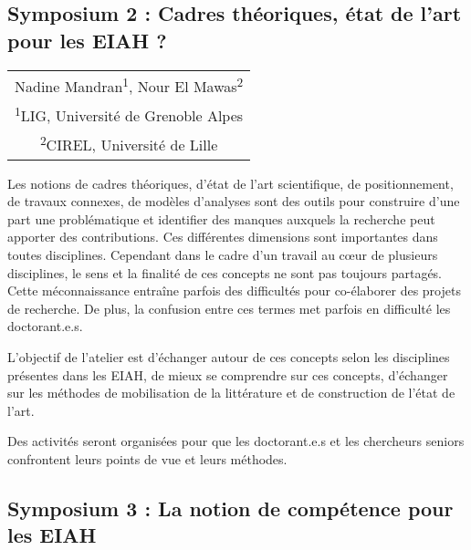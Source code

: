 \newpage

\vspace*{2em}
\begin{center}
	\subsection{Symposium 2 : Cadres théoriques, état de l’art pour les EIAH ?}
\end{center}

\vspace{1em}
\begin{center}
	\begin{tabular}{@{}c@{}}
		Nadine Mandran\textsuperscript{1}, Nour El Mawas\textsuperscript{2}\\
		\textsuperscript{1}LIG, Université de Grenoble Alpes \\
		\textsuperscript{2}CIREL, Université de Lille
	\end{tabular}
\end{center}

\vspace{2em}

Les notions de cadres théoriques, d’état de l’art scientifique, de positionnement, de travaux connexes, de modèles d’analyses sont des outils pour construire d’une part une problématique et identifier des manques auxquels la recherche peut apporter des contributions. Ces différentes dimensions sont importantes dans toutes disciplines. Cependant dans le cadre d’un travail au cœur de plusieurs disciplines, le sens et la finalité de ces concepts ne sont pas toujours partagés. Cette méconnaissance entraîne parfois des difficultés pour co-élaborer des projets de recherche. De plus, la confusion entre ces termes met parfois en difficulté les doctorant.e.s.

L’objectif de l’atelier est d’échanger autour de ces concepts selon les disciplines présentes dans les EIAH,  de mieux se comprendre sur ces concepts, d’échanger sur les méthodes de mobilisation de la littérature et de construction de l’état de l’art.

Des activités seront organisées pour que les doctorant.e.s et les chercheurs seniors confrontent leurs points de vue et leurs méthodes.

\newpage

\vspace*{2em}
\begin{center}
	\subsection{Symposium 3 : La notion de compétence pour les EIAH}
\end{center}

